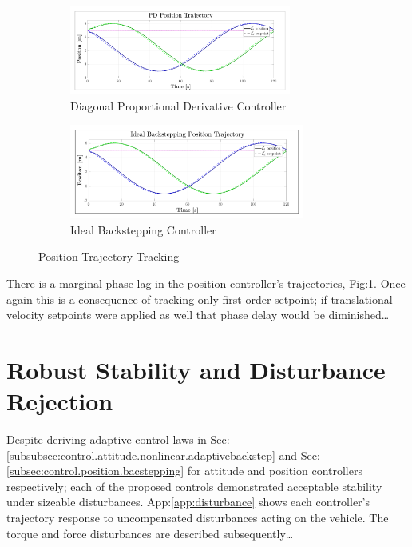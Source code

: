 \begin{figure}[hbtp]
\vspace{-12pt}
\begin{subfigure}{\textwidth}
\centering
\includegraphics[width=0.8\textwidth]{graphs/PD_Position_Trajectory}
\vspace{-12pt}
\caption{Diagonal Proportional Derivative Controller}
\end{subfigure}
\begin{subfigure}{\textwidth}
\vspace{-3pt}
\centering
\includegraphics[width=0.85\textwidth]{graphs/IBC_Position_Trajectory}
\vspace{-12pt}
\caption{Ideal Backstepping Controller}
\end{subfigure}
\caption{Position Trajectory Tracking}
\label{fig:position-trajectory-tracking}
\vspace{-10pt}
\end{figure}
\par
There is a marginal phase lag in the position controller's trajectories, Fig:\ref{fig:position-trajectory-tracking}. Once again this is a consequence of tracking only first order setpoint; if translational velocity setpoints were applied as well that phase delay would be diminished\ldots
\section{Robust Stability and Disturbance Rejection}
\label{sec:simulation.disturbnace}
Despite deriving adaptive control laws in Sec:\ref{subsubsec:control.attitude.nonlinear.adaptivebackstep} and Sec:\ref{subsec:control.position.bacstepping} for attitude and position controllers respectively; each of the proposed controls demonstrated acceptable stability under sizeable disturbances. App:\ref{app:disturbance} shows each controller's trajectory response to uncompensated disturbances acting on the vehicle. The torque and force disturbances are described subsequently\ldots
